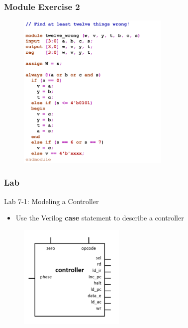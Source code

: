 \documentclass[t, notes, xcolor=table]{beamer}
\begin{document}
\begin{frame}
\frametitle{Module Exercise 2}
\begin{figure}
    \includegraphics[width=0.65\textwidth]{img/06_ex2.png}
\end{figure}
\end{frame}

\begin{frame}
\frametitle{Lab}
Lab 7-1: Modeling a Controller
\begin{itemize}
\item Use the Verilog \textbf{case} statement to describe a controller
\end{itemize}
\begin{figure}
    \includegraphics[width=0.45\textwidth]{img/06_lab.png}
\end{figure}
\end{frame}
\end{document}
